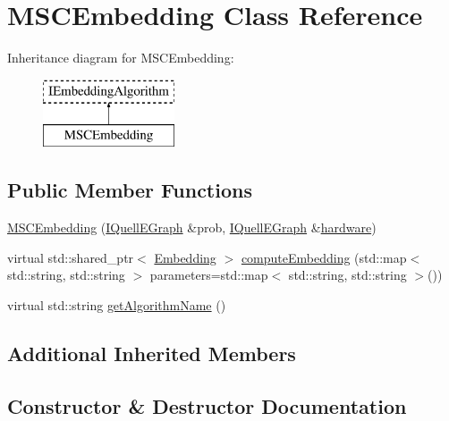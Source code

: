 \hypertarget{a00088}{}\section{M\+S\+C\+Embedding Class Reference}
\label{a00088}
Inheritance diagram for M\+S\+C\+Embedding\+:\begin{figure}[H]
\begin{center}
\leavevmode
\includegraphics[height=2.000000cm]{a00088}
\end{center}
\end{figure}
\subsection*{Public Member Functions}
\begin{DoxyCompactItemize}
\item 
\hyperlink{a00088_a121cd4bb6ed8a7f520070482a2954c46}{M\+S\+C\+Embedding} (\hyperlink{a00076}{I\+Quell\+E\+Graph} \&prob, \hyperlink{a00076}{I\+Quell\+E\+Graph} \&\hyperlink{a00071_aacf081e6ad5824b339b212844eb61b63}{hardware})
\item 
virtual std\+::shared\+\_\+ptr$<$ \hyperlink{a00050}{Embedding} $>$ \hyperlink{a00088_ad1d4dd78521d916ce370ab4b109c5222}{compute\+Embedding} (std\+::map$<$ std\+::string, std\+::string $>$ parameters=std\+::map$<$ std\+::string, std\+::string $>$())
\item 
virtual std\+::string \hyperlink{a00088_a584852f9b912480086b27c1f1f14274e}{get\+Algorithm\+Name} ()
\end{DoxyCompactItemize}
\subsection*{Additional Inherited Members}


\subsection{Constructor \& Destructor Documentation}
